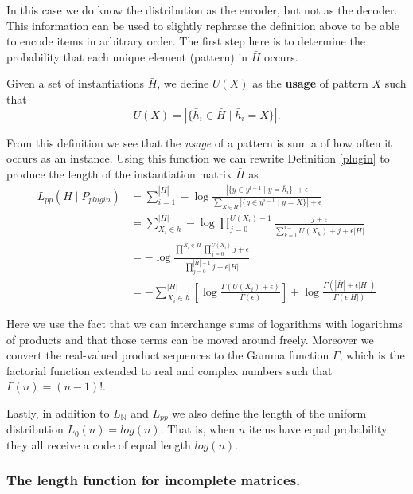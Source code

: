 \documentclass{llncs}
\begin{document}
In this case we do know the distribution as the encoder, but not as the decoder. This information can be used to slightly rephrase the definition above to be able to encode items in arbitrary order. The first step here is to determine the probability that each unique element (pattern) in $\bar{H}$ occurs. 

\begin{definition}\label{usage}
Given a set of instantiations $\bar{H}$, we define $U(X)$ as the \textbf{usage} of pattern $X$ such that
$$
	U(X) = |\{ \bar{h}_i \in \bar{H} \mid \bar{h}_i = X\}|.
$$
\end{definition}


From this definition we see that the \emph{usage} of a pattern is sum a of how often it occurs as an instance. Using this function we can rewrite Definition \ref{plugin} to produce the length of the instantiation matrix $\bar{H}$ as
\begin{align*}
	L_{pp}(\bar{H}\mid P_{plugin}) &= \sum^{|\bar{H}|}_{i=1} -\log \frac{|\{y \in y^{i-1} \mid y = \bar{h}_i\}| + \epsilon }{\sum_{X \in H}|\{y \in y^{i-1} \mid y = X\}| + \epsilon}\\
	&= \sum^{|H|}_{X_i \in h} -\log \prod^{U(X_i)-1}_{j=0} \frac{j+\epsilon}{\sum^{i-1}_{k=1} U(X_k)+j+\epsilon|H|} \\
	&= -\log \frac{\prod^{X_i\in H} \prod^{U(X_i)}_{j=0} j + \epsilon}{\prod^{|\bar{H}|-1}_{j=0} j + \epsilon|H|} \\
	&= -\sum^{|H|}_{X_i \in h} \left[ \log \frac{\Gamma(U(X_i)+\epsilon)}{\Gamma(\epsilon)}\right] + \log \frac{\Gamma(|\bar{H}| + \epsilon|H|)}{\Gamma(\epsilon|H|)}
\end{align*}

Here we use the fact that we can interchange sums of logarithms with logarithms of products and that those terms can be moved around freely. Moreover we convert the real-valued product sequences to the Gamma function $\Gamma$, which is the factorial function extended to real and complex numbers such that $\Gamma(n) = (n-1)!$.

Lastly, in addition to $L_{\mathbb{N}}$ and $L_{pp}$ we also define the length of the uniform distribution $L_0(n)=log(n)$. That is, when $n$ items have equal probability they all receive a code of equal length $log(n)$.

\subsubsection{The length function for incomplete matrices.}
\end{document}

